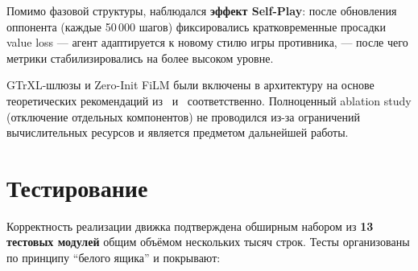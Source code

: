 \documentclass[a4paper,12pt]{extarticle}
\begin{document}
Помимо фазовой структуры, наблюдался \textbf{эффект Self-Play}: после обновления оппонента (каждые 50\,000 шагов) фиксировались кратковременные просадки value loss --- агент адаптируется к новому стилю игры противника, --- после чего метрики стабилизировались на более высоком уровне.

GTrXL-шлюзы и Zero-Init FiLM были включены в архитектуру на основе теоретических рекомендаций из~\cite{gtrxl} и~\cite{dreamerv3} соответственно. Полноценный ablation study (отключение отдельных компонентов) не проводился из-за ограничений вычислительных ресурсов и является предметом дальнейшей работы.

\newpage

\section{Тестирование}

Корректность реализации движка подтверждена обширным набором из \textbf{13 тестовых модулей} общим объёмом нескольких тысяч строк. Тесты организованы по принципу ``белого ящика'' и покрывают:
\end{document}
